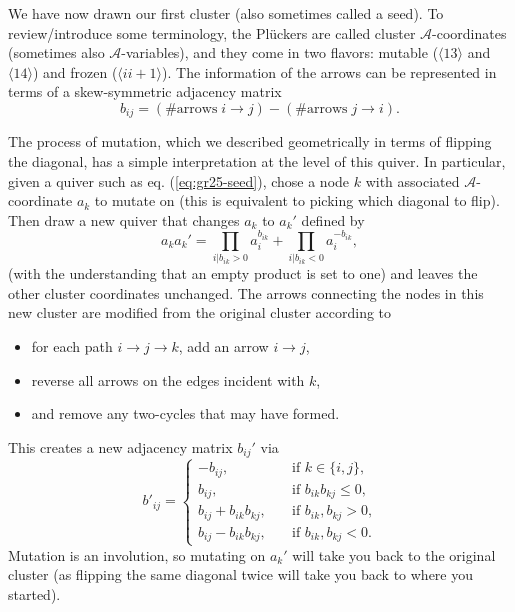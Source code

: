 \documentclass[11pt]{article}
\def\ket#1{\langle #1 \rangle}
\def\a{\mathcal{A}}
\begin{document}
We have now drawn our first cluster (also sometimes called a seed). To review/introduce some terminology, the Pl\"uckers are called cluster $\a$-coordinates (sometimes also $\a$-variables), and they come in two flavors: mutable ($\ket{13}$ and $\ket{14}$) and frozen ($\ket{ii+1}$). The information of the arrows can be represented in terms of a skew-symmetric adjacency matrix
\begin{equation}
	b_{i j} = (\# \text{arrows}\; i \to j) - (\# \text{arrows}\; j \to i).
\label{eq:bijdef}
\end{equation}

The process of mutation, which we described geometrically in terms of flipping the diagonal, has a simple interpretation at the level of this quiver. In particular, given a quiver such as eq. (\ref{eq:gr25-seed}), chose a node $k$ with associated $\a$-coordinate $a_k$ to mutate on (this is equivalent to picking which diagonal to flip). Then draw a new quiver that changes $a_{k}$ to $a_{k}'$ defined by
\begin{equation}
  \label{eq:a-coord-mutation}
  a_{k} a_{k}' = \prod_{i \vert b_{i k} > 0} a_{i}^{b_{i k}} + \prod_{i \vert b_{i k} < 0} a_{i}^{-b_{i k}},
\end{equation} (with the understanding that an empty product is set to one) and leaves the other cluster coordinates unchanged. The arrows connecting the nodes in this new cluster are modified from the original cluster according to
\begin{itemize}
	\item for each path $i\to j \to k$, add an arrow $i\to j$,
	\item reverse all arrows on the edges incident with $k$,
	\item and remove any two-cycles that may have formed.
\end{itemize}
This creates a new adjacency matrix $b_{ij}'$ via 
\begin{equation}
  \label{eq:b-mutation}
  b'_{i j} =
  \begin{cases}
    -b_{i j}, &\quad \text{if $k \in \lbrace i, j\rbrace$,}\\
    b_{i j}, &\quad \text{if $b_{i k} b_{k j} \leq 0$,}\\
    b_{i j} + b_{i k} b_{k j}, &\quad \text{if $b_{i k}, b_{k j} > 0$,}\\
    b_{i j} - b_{i k} b_{k j}, &\quad \text{if $b_{i k}, b_{k j} < 0$.}
  \end{cases}
\end{equation}
Mutation is an involution, so mutating on $a_k'$ will take you back to the original cluster (as flipping the same diagonal twice will take you back to where you started). 
\end{document}
